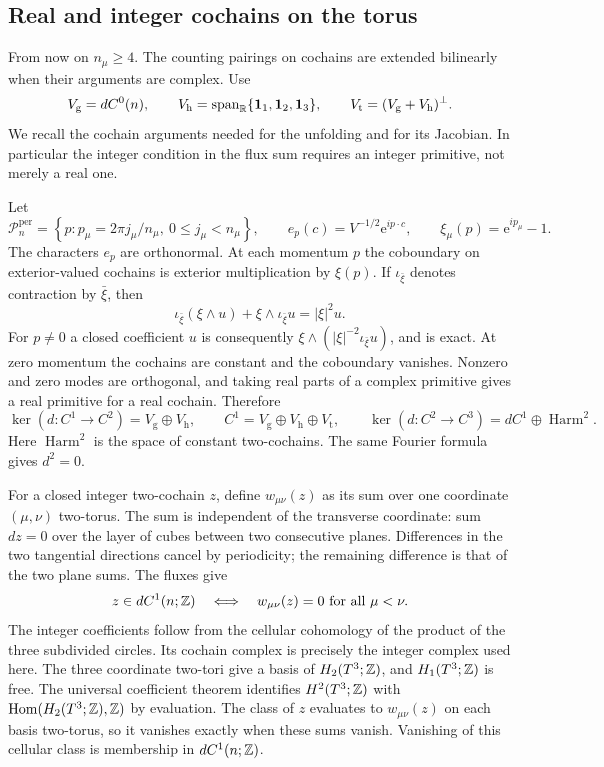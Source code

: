 \subsection{Real and integer cochains on the torus}
\label{subsec:external-cochains}

From now on $n_\mu\ge4$. The counting pairings on cochains
are extended bilinearly when their arguments are complex.
Use
\[
 V_{\mathrm g}=dC^0(n),\qquad
 V_{\mathrm h}=\operatorname{span}_{\mathbb R}\{\mathbf1_1,\mathbf1_2,\mathbf1_3\},
 \qquad
 V_{\mathrm t}=(V_{\mathrm g}+V_{\mathrm h})^\perp.
\]
We recall the cochain arguments needed for the unfolding and
for its Jacobian. In particular the integer condition in the
flux sum requires an integer primitive, not merely a real one.

Let
\[
 \mathcal P_n^{\mathrm{per}}=
   \left\{p:p_\mu=2\pi j_\mu/n_\mu,\ 0\le j_\mu<n_\mu\right\},
 \qquad e_p(c)=V^{-1/2}\mathrm e^{ip\cdot c},\qquad
 \xi_\mu(p)=\mathrm e^{ip_\mu}-1.
\]
The characters $e_p$ are orthonormal. At each momentum $p$ the
coboundary on exterior-valued cochains is exterior multiplication
by $\xi(p)$. If $\iota_{\bar\xi}$ denotes contraction by $\bar\xi$,
then
\[
 \iota_{\bar\xi}(\xi\wedge u)+
                  \xi\wedge\iota_{\bar\xi}u=|\xi|^2u.
\]
For $p\ne0$ a closed coefficient $u$ is consequently
$\xi\wedge(|\xi|^{-2}\iota_{\bar\xi}u)$, and is exact.
At zero momentum the cochains are constant and the
coboundary vanishes. Nonzero and zero modes are orthogonal,
and taking real parts of a complex primitive gives a real
primitive for a real cochain. Therefore
\begin{equation}\label{eq:external-Hodge}
 \ker(d:C^1\to C^2)=V_{\mathrm g}\oplus V_{\mathrm h},
 \qquad C^1=V_{\mathrm g}\oplus V_{\mathrm h}\oplus V_{\mathrm t},
 \qquad
 \ker(d:C^2\to C^3)=dC^1\oplus\operatorname{Harm}^2.
\end{equation}
Here $\operatorname{Harm}^2$ is the space of constant two-cochains.
The same Fourier formula gives $d^2=0$.

For a closed integer two-cochain $z$, define
$w_{\mu\nu}(z)$ as its sum over one coordinate $(\mu,\nu)$
two-torus. The sum is independent of the transverse coordinate:
sum $dz=0$ over the layer of cubes between two consecutive
planes. Differences in the two tangential directions cancel
by periodicity; the remaining difference is that of the two
plane sums. The fluxes give
\begin{equation}\label{eq:external-integer-two-exactness}
 z\in dC^1(n;\mathbb Z)\quad\Longleftrightarrow\quad
                         w_{\mu\nu}(z)=0\ \text{for all }\mu<\nu.
\end{equation}
The integer coefficients follow from the
cellular cohomology of the product of the three subdivided
circles. Its cochain complex is precisely the integer complex
used here. The three coordinate two-tori give a basis of
$H_2(T^3;\mathbb Z)$, and $H_1(T^3;\mathbb Z)$ is free. The universal
coefficient theorem identifies $H^2(T^3;\mathbb Z)$ with
$\operatorname{Hom}(H_2(T^3;\mathbb Z),\mathbb Z)$ by evaluation.
The class of $z$ evaluates to $w_{\mu\nu}(z)$ on each basis
two-torus, so it vanishes exactly when these sums vanish.
Vanishing of this cellular class is membership in
$dC^1(n;\mathbb Z)$.
\cite[Theorems~3.2, 3.5 and~3B.6]{Hatcher2002}

